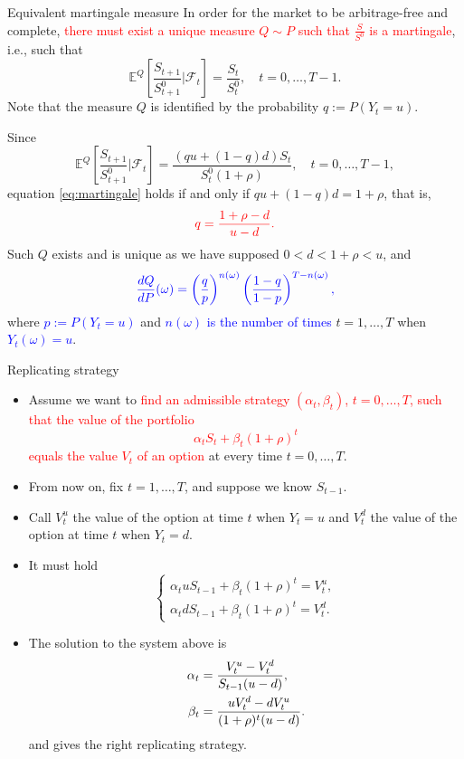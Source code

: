 \documentclass[9 pt]{beamer} %
\def \blue {\textcolor{blue}}
\def \red {\textcolor{red}}
\def \F {\mathcal{F}}
\def \bE {\mathbb{E}}
\begin{document}
\begin{frame}{Equivalent martingale measure}
In order for the market to be arbitrage-free and complete, \red{there must exist a unique measure $Q \sim P$ such that $\frac{S}{S^0}$ is a martingale}, i.e., such that
\begin{equation}\label{eq:martingale}
\bE^Q\left[\frac{S_{t+1}}{S^0_{t+1}}\big|\F_t\right]=\frac{S_{t}}{S^0_{t}}, \quad t=0,\dots,T-1.
\end{equation}
Note that the measure $Q$ is identified by the probability $q:=P(Y_t=u)$.

Since
$$
\bE^Q\left[\frac{S_{t+1}}{S^0_{t+1}}\big|\F_t\right] =\frac{(qu+(1-q)d)S_t}{S_t^0(1+\rho)}, \quad t=0,\dots,T-1,
$$
equation \eqref{eq:martingale} holds if and only if $qu+(1-q)d=1+\rho$, that is,
$$
\red{q=\frac{1+\rho-d}{u-d}.}
$$
Such $Q$ exists and is unique as we have supposed $0<d<1+\rho<u$, and 
$$
\blue{\frac{dQ}{dP}(\omega)=\left(\frac{q}{p}\right)^{n(\omega)}\left(\frac{1-q}{1-p}\right)^{T-n(\omega)},}
$$
where \blue{$p:=P(Y_t=u)$} and \blue{$n(\omega)$ is the number of times} $t=1,\dots,T$ when \blue{$Y_t(\omega)=u$}.
\end{frame}


\begin{frame}{Replicating strategy}
\begin{itemize}
\item Assume we want to \red{find an admissible strategy $(\alpha_t,\beta_t)$, $t=0, \dots, T$, such that the value of the portfolio
$$
\alpha_t S_t + \beta_t(1+\rho)^t
$$
equals the value $V_t$  of an option} at every time  $t = 0, \dots, T$.
\item From now on, fix $t=1,\dots,T$, and suppose we know $S_{t-1}$.
\item Call $V_t^u$ the value of the option at time $t$ when $Y_t=u$ and $V_t^d$ the value of the option at time $t$ when $Y_t=d$. 
\item It must hold
$$
\begin{cases}
\alpha_t u S_{t-1} + \beta_t (1+\rho)^t = V_t^u,\\
\alpha_t d S_{t-1} + \beta_t (1+\rho)^t = V_t^d.
\end{cases}
$$
\item The solution to the system above is
\blue{\begin{align}
\alpha_t &= \frac{V_t^u-V_t^d}{S_{t-1}(u-d)},\notag \\
\beta_t &= \frac{uV_t^d-dV_t^u}{(1+\rho)^t(u-d)}.\notag
\end{align}}
and gives the right replicating strategy.
\end{itemize}
\end{frame}
\end{document}
